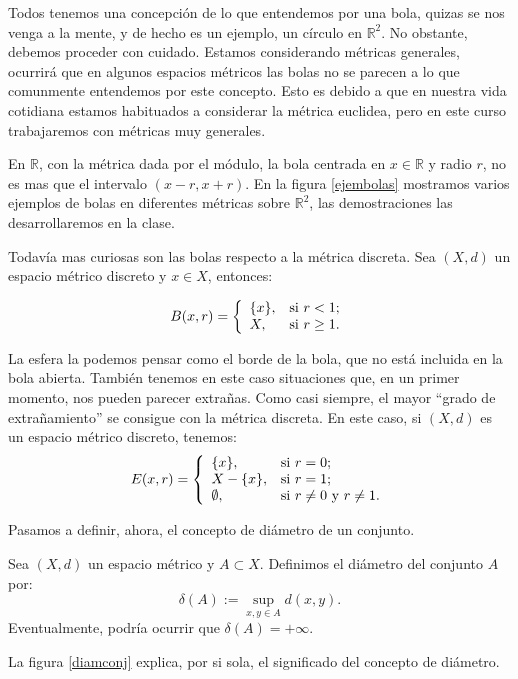 Todos tenemos una concepción de lo que entendemos por una bola,
quizas se nos venga a la mente, y de hecho es un ejemplo, un
círculo en $\mathbb{R}^2$. No obstante, debemos proceder con
cuidado. Estamos considerando métricas generales, ocurrirá que
en algunos espacios métricos las  bolas no se parecen a lo
que comunmente entendemos por este concepto. Esto es debido a que
en nuestra vida cotidiana estamos habituados a considerar la
métrica euclidea, pero en este curso trabajaremos con métricas
muy generales.

En $\mathbb{R}$, con la métrica dada por el módulo, la bola
centrada en $x\in\mathbb{R}$ y radio $r$, no es mas que el
intervalo $(x-r,x+r)$. En la figura \vref{ejembolas}  mostramos
varios ejemplos de bolas en diferentes métricas sobre
$\mathbb{R}^2$, las demostraciones las desarrollaremos en la
clase.


Todavía mas curiosas son las bolas respecto a la métrica
discreta. Sea $(X,d)$ un espacio métrico discreto y $x\in X$,
entonces:

\[B(x,r)=\left\{
\begin{array}{ll}
	\{x\}, & \hbox{si $r<1$;} \\
	X, & \hbox{si $r\geq 1$.} \\
\end{array}
\right.
\]

La esfera la podemos pensar como el borde de la bola, que no
está incluida en la bola abierta. También tenemos en este caso
situaciones que, en un primer momento, nos pueden parecer
extra\~nas. Como casi siempre, el mayor ``grado de
extra\~namiento'' se consigue con la métrica discreta. En este
caso, si $(X,d)$ es un espacio métrico discreto, tenemos:
\[E(x,r)=\left\{
\begin{array}{ll}
	\{x\}, & \hbox{si $r=0$;} \\
	X-\{x\}, & \hbox{si $r=1$;} \\
	\emptyset, & \hbox{si $r\neq 0$ y $r\neq 1$.} \\
\end{array}
\right.
\]

Pasamos a definir, ahora, el concepto de diámetro de un
conjunto.

\begin{definicion}{} Sea $(X,d)$ un espacio métrico y $A\subset
X$. Definimos el diámetro del conjunto $A$ por:
\[
	\delta(A):=\sup\limits_{x,y\in A}d(x,y).
\]
Eventualmente, podría ocurrir que $\delta(A)=+\infty$.
\end{definicion}
La figura \vref{diamconj} explica, por si sola, el significado del
concepto de diámetro.




